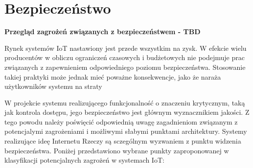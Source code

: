 	\section{Bezpieczeństwo}
		\textbf{Przegląd zagrożeń związanych z bezpieczeństwem - TBD}



		Rynek systemów IoT nastawiony jest przede wszystkim na zysk. W efekcie wielu producentów w obliczu ograniczeń czasowych i budżetowych nie podejmuje prac związanych z zapewnieniem odpowiedniego poziomu bezpieczeństwa. Stosowanie takiej praktyki może jednak mieć poważne konsekwencje, jako że naraża użytkowników systemu na straty

		W projekcie systemu realizującego funkcjonalność o znaczeniu krytycznym, taką jak kontrola dostępu, jego bezpieczeństwo jest głównym wyznacznikiem jakości. Z tego powodu należy poświęcić odpowiednią uwagę zagadnieniom związanym z potencjalymi zagrożeniami i możliwymi słabymi punktami architektury. Systemy realizujące ideę Internetu Rzeczy są sczególnym wyzwaniem z punktu widzenia bezpieczeństwa. Poniżej przedstawiono wybrane punkty zaproponowanej w \cite{iot-vulnerabilities} klasyfikacji potencjalnych zagrożeń w systemach IoT:

